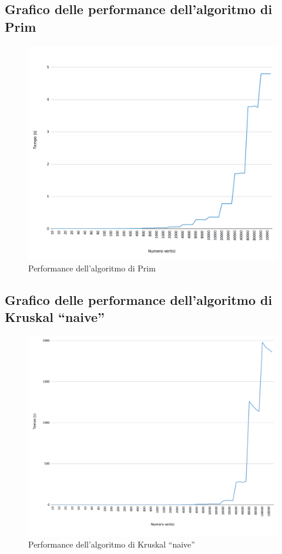 \subsection{Grafico delle performance dell'algoritmo di Prim}

	\begin{centering}
		\begin{figure}[H]
			\hspace{-1cm}\includegraphics[width=19cm]{Img/prim_result.png}
			\caption{Performance dell'algoritmo di Prim}
		\end{figure}
	\end{centering}

\subsection{Grafico delle performance dell'algoritmo di Kruskal ``naive''}
	\begin{figure}[H]
		\hspace{-1cm}\includegraphics[width=18.5cm]{Img/kruskal_naive_result.png}
		\caption{Performance dell'algoritmo di Kruskal ``naive''}
	\end{figure}

